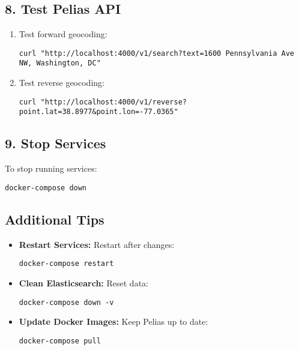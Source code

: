 \documentclass{article}
\begin{document}
\subsection*{8. Test Pelias API}
\begin{enumerate}
    \item Test forward geocoding:
    \begin{lstlisting}
curl "http://localhost:4000/v1/search?text=1600 Pennsylvania Ave NW, Washington, DC"
    \end{lstlisting}
    \item Test reverse geocoding:
    \begin{lstlisting}
curl "http://localhost:4000/v1/reverse?point.lat=38.8977&point.lon=-77.0365"
    \end{lstlisting}
\end{enumerate}

\subsection*{9. Stop Services}
To stop running services:
\begin{lstlisting}
docker-compose down
\end{lstlisting}

\subsection*{Additional Tips}
\begin{itemize}
    \item \textbf{Restart Services:} Restart after changes:
    \begin{lstlisting}
docker-compose restart
    \end{lstlisting}
    \item \textbf{Clean Elasticsearch:} Reset data:
    \begin{lstlisting}
docker-compose down -v
    \end{lstlisting}
    \item \textbf{Update Docker Images:} Keep Pelias up to date:
    \begin{lstlisting}
docker-compose pull
    \end{lstlisting}
\end{itemize}
\end{document}
